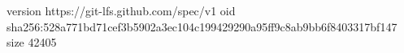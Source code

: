 version https://git-lfs.github.com/spec/v1
oid sha256:528a771bd71cef3b5902a3ec104c199429290a95ff9c8ab9bb6f8403317bf147
size 42405
